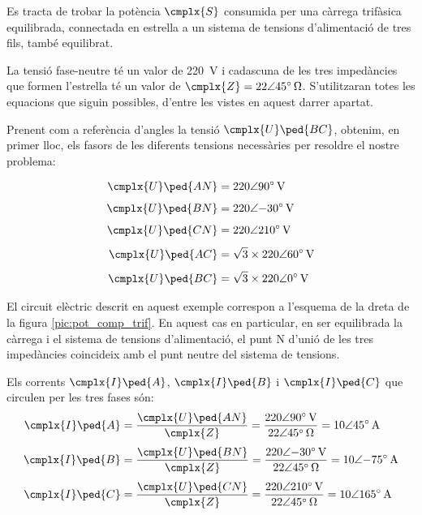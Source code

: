 	
\begin{exemple}[\PotSistTresFils{}]
	\addcontentsxms{\PotSistTresFils}
    Es tracta de trobar la potència $\cmplx{S}$ consumida per una càrrega
    trifàsica equilibrada, connectada en estrella a un sistema de tensions
    d'alimentació  de tres fils, també equilibrat.

    La tensió fase-neutre
    té un valor de \qty{220}{V} i cadascuna de les tres  impedàncies
    que formen l'estrella té un valor de $\cmplx{Z}=\complexqty{22:45}{\ohm}$.
     S'utilitzaran totes les equacions que
    siguin possibles, d'entre les vistes en aquest darrer apartat.

    Prenent com a referència d'angles la tensió
    $\cmplx{U}\ped{BC}$, obtenim, en primer lloc, els fasors de
    les diferents tensions necessàries per resoldre el nostre
    problema:

    \hfill
    \begin{minipage}[b]{7.5cm}
        
    \end{minipage}
    \hfill
    \begin{minipage}[b][5.7cm][t]{4cm}
    \begin{align*}
        \cmplx{U}\ped{AN} &= \complexqty{220:90}{V} \\[1ex]
        \cmplx{U}\ped{BN} &= \complexqty{220:-30}{V} \\[1ex]
        \cmplx{U}\ped{CN} &= \complexqty{220:210}{V}\\[1ex]
        \cmplx{U}\ped{AC} &= \sqrt{3}\times \complexqty{220:60}{V} \\[1ex]
        \cmplx{U}\ped{BC} &= \sqrt{3}\times \complexqty{220:0}{V}
    \end{align*}
    \end{minipage}
    \hfill{}
    
	El circuit elèctric descrit en aquest exemple  correspon a
	l'esquema de la dreta de la figura \vref{pic:pot_comp_trif}. En
	aquest cas en particular, en ser equilibrada la càrrega i el
	sistema de tensions d'alimentació, el punt N d'unió de  les tres impedàncies coincideix amb el punt neutre del sistema de tensions.

    Els corrents $\cmplx{I}\ped{A}$, $\cmplx{I}\ped{B}$ i $\cmplx{I}\ped{C}$ que
    circulen  per les tres fases són:
    \begin{align*}
        \cmplx{I}\ped{A} &=\frac{\cmplx{U}\ped{AN}}{\cmplx{Z}} =
        \frac{\complexqty{220:90}{V}}{\complexqty{22:45}{\ohm}} =
        \complexqty{10:45}{A}\\[1mm]
        \cmplx{I}\ped{B} &=\frac{\cmplx{U}\ped{BN}}{\cmplx{Z}} =
        \frac{\complexqty{220:-30}{V}}{\complexqty{22:45}{\ohm}} =
        \complexqty{10:-75}{A}\\[1mm]
        \cmplx{I}\ped{C} &=\frac{\cmplx{U}\ped{CN}}{\cmplx{Z}} =
        \frac{\complexqty{220:210}{V}}{\complexqty{22:45}{\ohm}} =
        \complexqty{10:165}{A}
    \end{align*}



\end{exemple}

